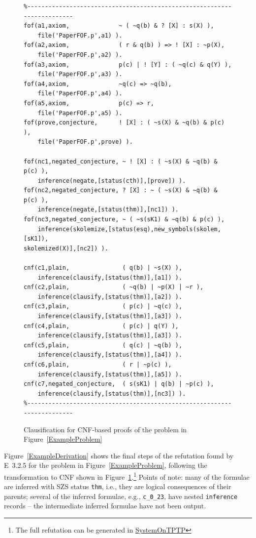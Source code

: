 \documentclass[runningheads]{llncs}
\newcommand{\smalltt}[1]{\small \texttt{#1}}
\begin{document}
\begin{figure}[htb]
\centering
{\footnotesize
{\setlength{\baselineskip}{4mm}
\begin{verbatim}
%------------------------------------------------------------------------
fof(a1,axiom,              ~ ( ~q(b) & ? [X] : s(X) ),
    file('PaperFOF.p',a1) ).
fof(a2,axiom,              ( r & q(b) ) => ! [X] : ~p(X),
    file('PaperFOF.p',a2) ).
fof(a3,axiom,              p(c) | ! [Y] : ( ~q(c) & q(Y) ),
    file('PaperFOF.p',a3) ).
fof(a4,axiom,              ~q(c) => ~q(b),
    file('PaperFOF.p',a4) ).
fof(a5,axiom,              p(c) => r,
    file('PaperFOF.p',a5) ).
fof(prove,conjecture,      ! [X] : ( ~s(X) & ~q(b) & p(c) ),
    file('PaperFOF.p',prove) ).

fof(nc1,negated_conjecture, ~ ! [X] : ( ~s(X) & ~q(b) & p(c) ),
    inference(negate,[status(cth)],[prove]) ).
fof(nc2,negated_conjecture, ? [X] : ~ ( ~s(X) & ~q(b) & p(c) ),
    inference(negate,[status(thm)],[nc1]) ).
fof(nc3,negated_conjecture, ~ ( ~s(sK1) & ~q(b) & p(c) ),
    inference(skolemize,[status(esq),new_symbols(skolem,[sK1]),
skolemized(X)],[nc2]) ).

cnf(c1,plain,               ( q(b) | ~s(X) ),
    inference(clausify,[status(thm)],[a1]) ).
cnf(c2,plain,               ( ~q(b) | ~p(X) | ~r ),
    inference(clausify,[status(thm)],[a2]) ).
cnf(c3,plain,               ( p(c) | ~q(c) ),
    inference(clausify,[status(thm)],[a3]) ).
cnf(c4,plain,               ( p(c) | q(Y) ),
    inference(clausify,[status(thm)],[a3]) ).
cnf(c5,plain,               ( q(c) | ~q(b) ),
    inference(clausify,[status(thm)],[a4]) ).
cnf(c6,plain,               ( r | ~p(c) ),
    inference(clausify,[status(thm)],[a5]) ).
cnf(c7,negated_conjecture,  ( s(sK1) | q(b) | ~p(c) ),
    inference(clausify,[status(thm)],[nc3]) ).
%------------------------------------------------------------------------
\end{verbatim}
}}
\caption{Clausification for CNF-based proofs of the problem in Figure~\ref{ExampleProblem}}
\label{ExampleClausification}
\end{figure}

Figure~\ref{ExampleDerivation} shows the final steps of the refutation found by E~3.2.5 for the
problem in Figure~\ref{ExampleProblem}, following the transformation to CNF shown in 
Figure~\ref{ExampleClausification}.\footnote{%
The full refutation can be generated in \href{https://tptp.org/cgi-bin/SystemOnTPTP}{SystemOnTPTP}}
Points of note:
many of the formulae are inferred with SZS status {\smalltt{thm}}, i.e., they are logical 
consequences of their parents;
several of the inferred formulae, e.g., {\smalltt{c\_0\_23}}, have nested {\smalltt{inference}}
records -- the intermediate inferred formulae have not been output. 
\end{document}
